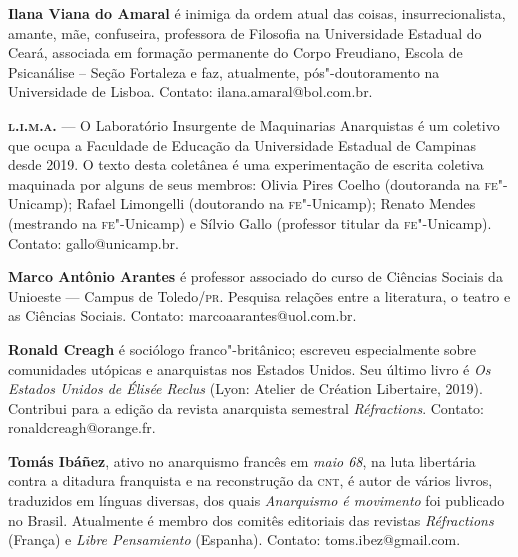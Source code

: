 \bigskip
\noindent\textbf{Ilana Viana do Amaral} é inimiga da ordem atual das coisas,
insurrecionalista, amante, mãe, confuseira, professora de Filosofia na
Universidade Estadual do Ceará, associada em formação permanente do
Corpo Freudiano, Escola de Psicanálise -- Seção Fortaleza e faz,
atualmente, pós"-doutoramento na Universidade de Lisboa. Contato:
ilana.amaral@bol.com.br.



\bigskip
\noindent\textbf{\textsc{l.i.m.a.}} --- O Laboratório Insurgente de Maquinarias
Anarquistas é um coletivo que ocupa a Faculdade de Educação da
Universidade Estadual de Campinas desde 2019. O texto desta coletânea é
uma experimentação de escrita coletiva maquinada por alguns de seus
membros: Olivia Pires Coelho (doutoranda na \textsc{fe}"-Unicamp); Rafael
Limongelli (doutorando na \textsc{fe}"-Unicamp); Renato Mendes (mestrando na
\textsc{fe}"-Unicamp) e Sílvio Gallo (professor titular da \textsc{fe}"-Unicamp). Contato:
gallo@unicamp.br.

\bigskip
\noindent\textbf{Marco Antônio Arantes} é professor associado do curso de
Ciências Sociais da Unioeste --- Campus de Toledo/\textsc{pr}. Pesquisa relações
entre a literatura, o teatro e as Ciências Sociais. Contato:
marcoaarantes@uol.com.br.

\bigskip
\noindent\textbf{Ronald Creagh} é sociólogo franco"-britânico; escreveu
especialmente sobre comunidades utópicas e anarquistas nos Estados
Unidos. Seu último livro é \emph{Os Estados Unidos de Élisée Reclus}
(Lyon: Atelier de Création Libertaire, 2019). Contribui para a edição da
revista anarquista semestral \emph{Réfractions}. Contato:
ronaldcreagh@orange.fr.

\bigskip
\noindent\textbf{Tomás Ibáñez}, ativo no anarquismo francês em \emph{maio 68}, na
luta libertária contra a ditadura franquista e na reconstrução da \textsc{cnt}, é
autor de vários livros, traduzidos em línguas diversas, dos quais
\emph{Anarquismo é movimento} foi publicado no Brasil. Atualmente é
membro dos comitês editoriais das revistas \emph{Réfractions} (França) e
\emph{Libre Pensamiento} (Espanha). Contato:
toms.ibez@gmail.com.



